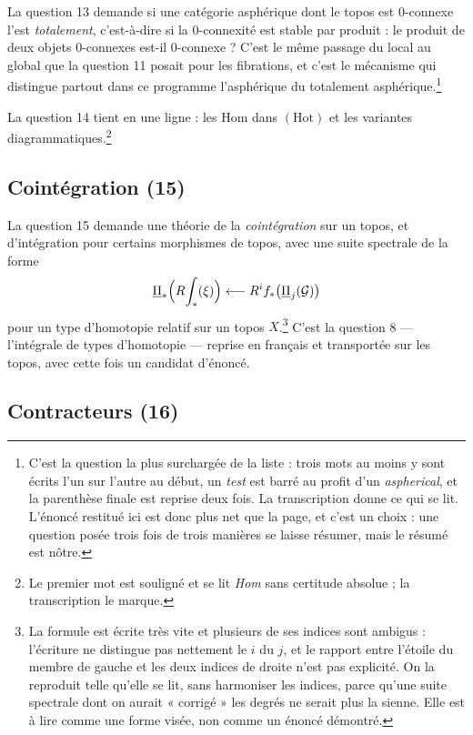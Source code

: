 \documentclass[11pt,a4paper]{article}
\begin{document}
La question 13 demande si une catégorie asphérique dont le topos est
0-connexe l'est \emph{totalement}, c'est-à-dire si la 0-connexité est stable par
produit : le produit de deux objets 0-connexes est-il 0-connexe ? C'est le
même passage du local au global que la question 11 posait pour les fibrations,
et c'est le mécanisme qui distingue partout dans ce programme l'asphérique du
totalement asphérique.\footnote{C'est la question la plus surchargée de la
liste : trois mots au moins y sont écrits l'un sur l'autre au début, un
\emph{test} est barré au profit d'un \emph{aspherical}, et la parenthèse finale
est reprise deux fois. La transcription donne ce qui se lit. L'énoncé restitué
ici est donc plus net que la page, et c'est un choix : une question posée trois
fois de trois manières se laisse résumer, mais le résumé est nôtre.}

La question 14 tient en une ligne : les $\mathrm{Hom}$ dans $(\mathrm{Hot})$ et
les variantes diagrammatiques.\footnote{Le premier mot est souligné et se lit
\emph{Hom} sans certitude absolue ; la transcription le marque.}

\subsection*{Cointégration (15)}

La question 15 demande une théorie de la \emph{cointégration} sur un topos, et
d'intégration pour certains morphismes de topos, avec une suite spectrale de la
forme
\[
\underline{\Pi}_{*}\Bigl(R\!\int_{*}(\xi)\Bigr) \longleftarrow
R^{i}f_{*}\bigl(\underline{\Pi}_{j}(\mathcal{G})\bigr)
\]
pour un type d'homotopie relatif sur un topos $X$.\footnote{La formule est
écrite très vite et plusieurs de ses indices sont ambigus : l'écriture ne
distingue pas nettement le $i$ du $j$, et le rapport entre l'étoile du membre
de gauche et les deux indices de droite n'est pas explicité. On la reproduit
telle qu'elle se lit, sans harmoniser les indices, parce qu'une suite spectrale
dont on aurait « corrigé » les degrés ne serait plus la sienne. Elle est à lire
comme une forme visée, non comme un énoncé démontré.} C'est la question 8 ---
l'intégrale de types d'homotopie --- reprise en français et transportée sur les
topos, avec cette fois un candidat d'énoncé.

\subsection*{Contracteurs (16)}
\end{document}
